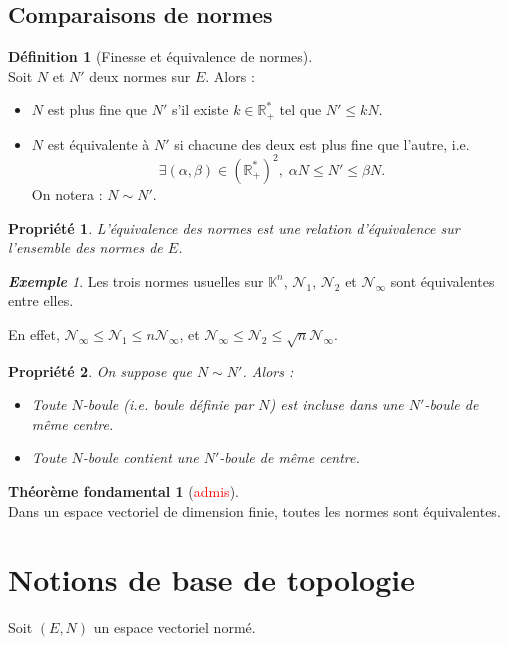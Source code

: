 \documentclass[12pt]{book}
\let\ensembleNombre\mathbb
\newcommand*\R{\ensuremath{\ensembleNombre{R}}}
\newcommand*\K{\ensuremath{\ensembleNombre{K}}}
\newtheorem*{prop}{Propriété}
\theoremstyle{definition}
\newtheorem*{defi}{Définition}
\newtheorem*{thmefond}{Théorème fondamental}
\theoremstyle{remark}
\newtheorem*{ex}{\textbf{Exemple}}
\newenvironment{fdef}
  {\begin{mdframed}[roundcorner=10pt, linewidth=1pt]\begin{defi}}
  {\end{defi}\end{mdframed}}
\newenvironment{fthmefond}
  {\begin{mdframed}[roundcorner=10pt, linewidth=3.5pt]\begin{thmefond}}
  {\end{thmefond}\end{mdframed}}
\begin{document}
	\subsection{Comparaisons de normes}
	\begin{fdef}[Finesse et équivalence de normes]\mbox{~}\\
	Soit $N$ et $N'$ deux normes sur $E$. Alors :
	\begin{itemize}
	\item $N$ est plus fine que $N'$ s'il existe $k \in \R_+^*$ tel que $N' \leq kN$.
	\item $N$ est équivalente à $N'$ si chacune des deux est plus fine que l'autre, i.e. 
	\[\exists (\alpha, \beta) \in \left( \R_+^* \right)^2, \; \alpha N \leq N' \leq \beta N.\]
	On notera : $N \sim N'$.
	\end{itemize}
	\end{fdef}
	
	\begin{prop}
	L'équivalence des normes est une relation d'équivalence sur l'ensemble des normes de $E$.
	\end{prop}
	
	\begin{ex}
	Les trois normes usuelles sur $\K^n$, $\mathcal N_1$, $\mathcal N_2$ et $\mathcal N_\infty$ sont équivalentes entre elles.
	
	En effet, $\mathcal N_\infty \leq \mathcal N_1 \leq n \mathcal N_\infty$, et $\mathcal N_\infty \leq \mathcal N_2 \leq \sqrt{n} \mathcal N_\infty$.
	\end{ex}
	
	\begin{prop}
	On suppose que $N \sim N'$. Alors : 
	\begin{itemize}
	\item Toute $N$-boule (i.e. boule définie par $N$) est incluse dans une $N'$-boule de même centre.
	\item Toute $N$-boule contient une $N'$-boule de même centre.	
	\end{itemize}
	\end{prop}
	
	\begin{fthmefond}[\textcolor{red}{admis}] \mbox{~}\\
	Dans un espace vectoriel de dimension finie, toutes les normes sont équivalentes.
	\end{fthmefond}
	
	\section{Notions de base de topologie}
	Soit $(E,N)$ un espace vectoriel normé.
\end{document}
